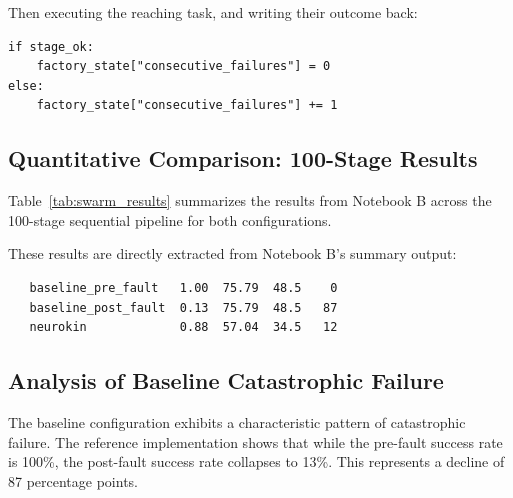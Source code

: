 ﻿\documentclass[12pt,a4paper,oneside]{report}
\begin{document}
Then executing the reaching task, and writing their outcome back:

\begin{verbatim}
if stage_ok:
    factory_state["consecutive_failures"] = 0
else:
    factory_state["consecutive_failures"] += 1
\end{verbatim}

\subsection{Quantitative Comparison: 100-Stage Results}

Table~\ref{tab:swarm_results} summarizes the results from Notebook B across the 100-stage sequential pipeline for both configurations.

\begin{table}[H]
\centering
\caption{Sequential swarm performance comparison (100 stages, progressive fault injection, from Notebook B).}
\label{tab:swarm_results}
\end{table}

These results are directly extracted from Notebook B's summary output:

\begin{verbatim}
   baseline_pre_fault   1.00  75.79  48.5    0
   baseline_post_fault  0.13  75.79  48.5   87
   neurokin             0.88  57.04  34.5   12
\end{verbatim}

\subsection{Analysis of Baseline Catastrophic Failure}

The baseline configuration exhibits a characteristic pattern of catastrophic failure. The reference implementation shows that while the pre-fault success rate is 100\%, the post-fault success rate collapses to 13\%. This represents a decline of 87 percentage points.
\end{document}
